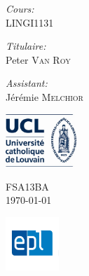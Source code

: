 \documentclass[a4paper,10pt]{article}
\begin{document}
\begin{titlepage}
\begin{minipage}{0.48\textwidth}
\begin{flushleft}
      \end{flushleft}
    \end{minipage}
    \begin{minipage}{0.48\textwidth}
      \begin{flushright} \large
        \textit{Cours:} \\
        LINGI1131 \\ \vspace{0.3cm} 
       
        \textit{Titulaire:} \\
        Peter \textsc{Van Roy} \\ \vspace{0.3cm} 
		
		\textit{Assistant:} \\
		Jérémie \textsc{Melchior} \\
      \end{flushright}
    \end{minipage}

    \vfill

    \begin{minipage}{0.3\textwidth}
      \begin{flushleft}
        \includegraphics[height=2cm]{logo_UCL.jpg}
      \end{flushleft}
    \end{minipage}
    \begin{minipage}{0.3\textwidth}
      \begin{center}
        {\large FSA13BA}\\
        {\large \today}
      \end{center}
    \end{minipage}
    \begin{minipage}{0.3\textwidth}
      \begin{flushright}
        \includegraphics[height=2cm]{logo_EPL.jpg}
      \end{flushright}
    \end{minipage}
\end{titlepage}
\end{document}
